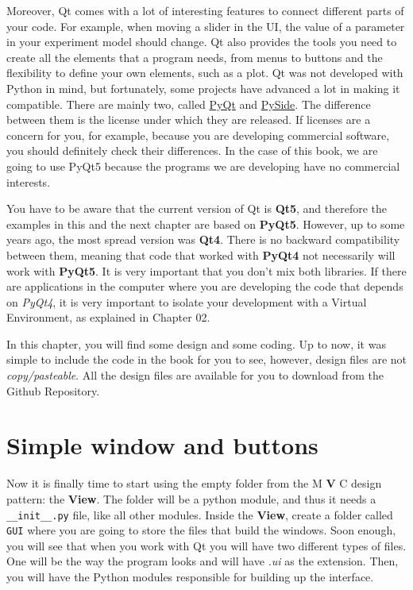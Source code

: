 Moreover, Qt comes with a lot of interesting features to connect
different parts of your code. For example, when moving a slider in the
{UI}, the value of a parameter in your experiment model should change.
Qt also provides the tools you need to create all the elements that a
program needs, from menus to buttons and the flexibility to define your
own elements, such as a plot. Qt was not developed with Python in mind,
but fortunately, some projects have advanced a lot in making it
compatible. There are mainly two, called
\href{https://riverbankcomputing.com/software/pyqt/intro}{PyQt} and
\href{https://wiki.qt.io/PySide}{PySide}. The difference between them is
the license under which they are released. If licenses are a concern for
you, for example, because you are developing commercial software, you
should definitely check their differences. In the case of this book, we
are going to use PyQt5 because the programs we are developing have no
commercial interests.

You have to be aware that the current version of Qt is \textbf{Qt5}, and
therefore the examples in this and the next chapter are based on
\textbf{PyQt5}. However, up to some years ago, the most spread version
was \textbf{Qt4}. There is no backward compatibility between them,
meaning that code that worked with \textbf{PyQt4} not necessarily will
work with \textbf{PyQt5}. It is very important that you don't mix both
libraries. If there are applications in the computer where you are
developing the code that depends on \emph{PyQt4}, it is very important
to isolate your development with a Virtual Environment, as explained in
Chapter 02.

In this chapter, you will find some design and some coding. Up to now,
it was simple to include the code in the book for you to see, however,
design files are not \emph{copy/pasteable}. All the design files are
available for you to download from the Github Repository.

\hypertarget{simple-window-and-buttons}{}
\section{Simple window and buttons}\label{simple-window-andbuttons}

Now it is finally time to start using the empty folder from the M
\textbf{V} C design pattern: the \textbf{View}. The folder will be a
python module, and thus it needs a \texttt{__init__.py} file, like
all other modules. Inside the \textbf{View}, create a folder called
\texttt{GUI} where you are going to store the files that build the
windows. Soon enough, you will see that when you work with Qt you will
have two different types of files. One will be the way the program looks
and will have \emph{.ui} as the extension. Then, you will have the
Python modules responsible for building up the interface.

